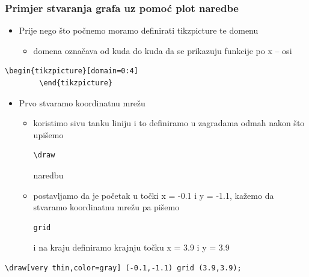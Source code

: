 \documentclass{beamer}
\begin{document}
\begin{frame}[fragile]
	\frametitle{Primjer stvaranja grafa uz pomoć plot naredbe}
		\begin{itemize}
			\item Prije nego što počnemo moramo definirati tikzpicture te domenu
			\begin{itemize}
			\item domena označava od kuda do kuda da se prikazuju funkcije po x – osi
			\end{itemize}
		\end{itemize}
		\begin{verbatim}\begin{tikzpicture}[domain=0:4]
		\end{tikzpicture}
		\end{verbatim}
		\begin{itemize}
			\item Prvo stvaramo koordinatnu mrežu
			\begin{itemize}
			\item koristimo sivu tanku liniju i to definiramo u zagradama odmah nakon što upišemo \begin{verbatim}\draw\end{verbatim} naredbu
			\item postavljamo da je početak u točki x = -0.1 i y = -1.1, kažemo da stvaramo koordinatnu mrežu pa pišemo \begin{verbatim}grid\end{verbatim} i na kraju definiramo krajnju točku x = 3.9 i y = 3.9 
			\end{itemize}
		\end{itemize}
		\begin{verbatim}\draw[very thin,color=gray] (-0.1,-1.1) grid (3.9,3.9);
		\end{verbatim}		
\end{frame}
\end{document}
